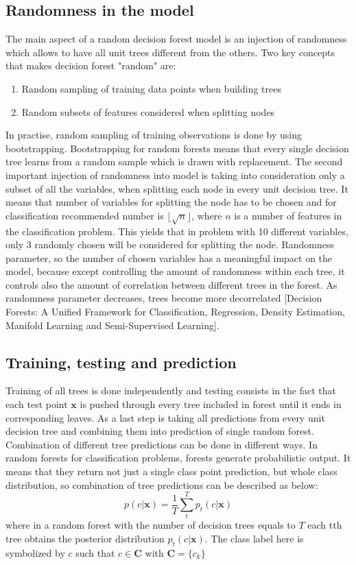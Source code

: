 \subsection{Randomness in the model}
The main aspect of a random decision forest model is an injection of randomness which allows to have all unit trees different from the others. Two key concepts that makes decision forest "random" are:
\begin{enumerate}
\item Random sampling of training data points when building trees
\item Random subsets of features considered when splitting nodes
\end{enumerate}
In practise, random sampling of training observations is done by using bootstrapping. Bootstrapping for random forests means that every single decision tree learns from a random sample which is drawn with replacement. The second important injection of randomness into model is taking into consideration only a subset of all the variables, when splitting each node in every unit decision tree. It means that number of variables for splitting the node has to be chosen and for classification recommended number is $\lfloor{\sqrt{n}} \rfloor$, where $n$ is a number of features in the classification problem. This yields that in problem with 10 different variables, only 3 randomly chosen will be considered for splitting the node. Randomness parameter, so the number of chosen variables has a meaningful impact on the model, because except controlling the amount of randomness within each tree, it controls also the amount of correlation between different trees in the forest. As randomness parameter decreases, trees become more decorrelated [Decision Forests: A Unified Framework for Classification, Regression, Density Estimation, Manifold Learning and Semi-Supervised Learning].
\subsection {Training, testing and prediction}
Training of all trees is done independently and testing consists in the fact that each test point $\textbf{x}$ is pushed through every tree included in forest until it ends in corresponding leaves. As a last step is taking all predictions from every unit decision tree and combining them into prediction of single random forest. Combination of different tree predictions can be done in different ways. In random forests for classification problems, forests generate probabilistic output. It means that they return not just a single class point prediction, but whole class distribution, so combination of tree predictions can be described as below:
\begin{equation}
p(c|\textbf{x}) =  \frac{1}{T} \displaystyle\sum_{t}^{T} p_{t}(c|\textbf{x})
\end{equation}
where in a random forest with the number of decision trees equals to $T$ each tth tree obtains the posterior distribution $ p_{t}(c|\textbf{x})$. The class label here is symbolized by $c$ such that $c \in \textbf{C}$ with $ \textbf{C} = \{ c_{k}\} $
